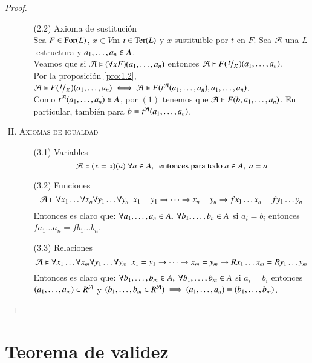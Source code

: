 \begin{proof}
\begin{enumerate}[(I)]
\begin{itemize}
            \item[(2.2)] Axioma de sustitución\\
                Sea $F \in \mathrm{For}(L)$, $x \in V$m $t \in \mathrm{Ter}(L)$ y $x$ sustituible por $t$ en $F$. Sea $\mathcal{A}$ una $L$-estructura y ${a}_{1}, \ldots, {a}_{n} \in A$.\\
                Veamos que si $\mathcal{A} \vDash (\forall x F)({a}_{1}, \ldots, {a}_{n})$ entonces $\mtc A \vDash F(\quox{t})(\sucn{a})$.\\
                Por la proposición \ref{pro:1.2}, $\mtc A \vDash F(\quox{t})(\sucn{a}) \iff \mtc A \vDash F(t^{\mtc A}(\sucn{a}), \sucn{a})$.\\
                Como $t^{\mathcal{A}}({a}_{1}, \ldots, {a}_{n}) \in A$, por $(1)$ tenemos que $\mathcal{A} \vDash F(b, {a}_{1}, \ldots, {a}_{n})$. En particular, también para $b = t^{\mathcal{A}}({a}_{1}, \ldots, {a}_{n})$.
        \end{itemize}
        \item \textsc{Axiomas de igualdad}
        \begin{itemize}
            \item[(3.1)] Variables\\
            $$
                \mtc A \vDash (x=x)(a)\ \forall a \in A,\ \text{ entonces para todo } a \in A,\ a = a
            $$
            \item[(3.2)] Funciones\\
            $$
                \mathcal{A} \vDash \forall x_1 \ldots \forall x_n \forall y_1 \ldots \forall y_n\ \ x_1 = y_1 \rightarrow \cdots \rightarrow x_n = y_n \rightarrow f x_1 \ldots x_n = f y_1 \ldots y_n
            $$
            Entonces es claro que: $\forall {a}_{1}, \ldots, {a}_{n} \in A,\ \forall {b}_{1}, \ldots, {b}_{n} \in A$ si $a_i = b_i$ entonces $f a_1 \ldots a_n = f b_1 \ldots b_n$.
            \item[(3.3)] Relaciones\\
            $$
                \mathcal{A} \vDash \forall x_1 \ldots \forall x_m \forall y_1 \ldots \forall y_m\ \ x_1 = y_1 \rightarrow \cdots \rightarrow x_m = y_m \rightarrow R x_1 \ldots x_m = R y_1 \ldots y_m
            $$
            Entonces es claro que: $\forall {b}_{1}, \ldots, {b}_{m} \in A,\ \forall {b}_{1}, \ldots, {b}_{m} \in A$ si $a_i = b_i$ entonces $({a}_{1}, \ldots, {a}_{m}) \in R^{\mathcal{A}}$ y $({b}_{1}, \ldots, {b}_{m} \in R^{\mathcal{A}}) \implies ({a}_{1}, \ldots, {a}_{n}) = ({b}_{1}, \ldots, {b}_{m})$.
        \end{itemize}
    \end{enumerate}
\end{proof}

\section{Teorema de validez}

